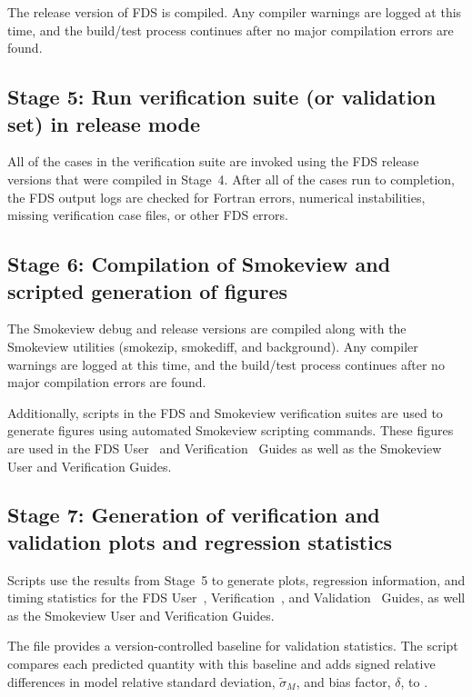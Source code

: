 \documentclass[11pt]{book}
\begin{document}
The release version of FDS is compiled. Any compiler warnings are logged at this time, and the build/test process continues after no major compilation errors are found.

\subsection*{Stage 5: Run verification suite (or validation set) in release mode}

All of the cases in the verification suite are invoked using the FDS release versions that were compiled in Stage~4. After all of the cases run to completion, the FDS output logs are checked for Fortran errors, numerical instabilities, missing verification case files, or other FDS errors.

\subsection*{Stage 6: Compilation of Smokeview and scripted generation of figures}

The Smokeview debug and release versions are compiled along with the Smokeview utilities (smokezip, smokediff, and background). Any compiler warnings are logged at this time, and the build/test process continues after no major compilation errors are found.

Additionally, scripts in the FDS and Smokeview verification suites are used to generate figures using automated Smokeview scripting commands. These figures are used in the FDS User~\cite{FDS_Users_Guide} and Verification~\cite{FDS_Verification_Guide} Guides as well as the Smokeview User and Verification Guides.

\subsection*{Stage 7: Generation of verification and validation plots and regression statistics}

Scripts use the results from Stage~5 to generate plots, regression information, and timing statistics for the FDS User~\cite{FDS_Users_Guide}, Verification~\cite{FDS_Verification_Guide}, and Validation~\cite{FDS_Validation_Guide} Guides, as well as the Smokeview User and Verification Guides.

The file  provides a version-controlled baseline for validation statistics. The script  compares each predicted quantity with this baseline and adds signed relative differences in model relative standard deviation, $\tilde{\sigma}_M$, and bias factor, $\delta$, to .
\end{document}
